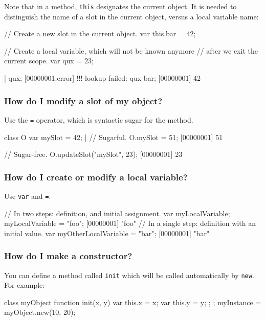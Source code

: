 Note that in a method, \lstinline{this} designates the current
object.  It is needed to distinguish the name of a slot in the current
object, versus a local variable name:

\begin{urbiscript}
{
  // Create a new slot in the current object.
  var this.bar = 42;

  // Create a local variable, which will not be known anymore
  // after we exit the current scope.
  var qux = 23;
}|
qux;
[00000001:error] !!! lookup failed: qux
bar;
[00000001] 42
\end{urbiscript}


\subsubsection{How do I modify a slot of my object?}
Use the \lstinline|=| operator, which is syntactic sugar for the
 method.

\begin{urbiscript}
class O
{
  var mySlot = 42;
}|
// Sugarful.
O.mySlot = 51;
[00000001] 51

// Sugar-free.
O.updateSlot("mySlot", 23);
[00000001] 23
\end{urbiscript}

\subsubsection{How do I create or modify a local variable?}
Use \lstinline|var| and \lstinline|=|.

\begin{urbiscript}
// In two steps: definition, and initial assignment.
var myLocalVariable;
myLocalVariable = "foo";
[00000001] "foo"
// In a single step: definition with an initial value.
var myOtherLocalVariable = "bar";
[00000001] "bar"
\end{urbiscript}


\subsubsection{How do I make a constructor?}
You can define a method called \lstinline{init} which will be called
automatically by \lstinline{new}. For example:

\begin{urbiunchecked}
class myObject
{
  function init(x, y)
  {
    var this.x = x;
    var this.y = y;
  };
};
myInstance = myObject.new(10, 20);
\end{urbiunchecked}


